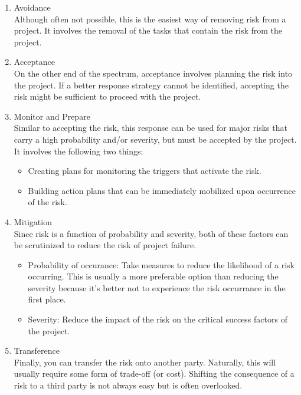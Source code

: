 \begin{enumerate}
\item Avoidance\\
Although often not possible, this is the easiest way of removing risk from a
project.  It involves the removal of the tasks that contain the risk from the
project.
\item Acceptance\\
On the other end of the spectrum, acceptance involves planning the risk into
the project.  If a better response strategy cannot be identified, accepting
the risk might be sufficient to proceed with the project.
\item Monitor and Prepare\\
Similar to accepting the risk, this response can be used for major risks that
carry a high probability and/or severity, but must be accepted by the project.
It involves the following two things:
\begin{itemize}
\item Creating plans for monitoring the triggers that activate the risk.
\item Building action plans that can be immediately mobilized upon occurrence of the risk.
\end{itemize}
\item Mitigation\\
Since risk is a function of probability and severity, both of these factors
can be scrutinized to reduce the risk of project failure.
\begin{itemize}
\item Probability of occurance:  Take measures to reduce the likelihood of a risk occurring.  This is usually a more preferable option than reducing the severity because it’s better not to experience the risk occurrance in the first place.
\item Severity:  Reduce the impact of the risk on the critical success factors of the project.
\end{itemize}
\item Transference\\
Finally, you can transfer the risk onto another party.  Naturally, this
will usually require some form of trade-off (or cost).  Shifting the
consequence of a risk to a third party is not always easy but is often overlooked.
\end{enumerate}

\newpage
